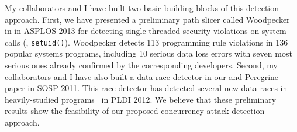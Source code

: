 



 


 My collaborators and I have built two basic 
building blocks of this detection approach. First, we have presented a 
preliminary path slicer called Woodpecker~\cite{woodpecker:asplos13} in 
in ASPLOS 2013 for detecting single-threaded security violations on system 
calls (\eg, \texttt{setuid()}). Woodpecker detects 113 programming rule 
violations in 136 popular systems programs, including 10 serious data loss 
errors with seven most serious ones already confirmed by the corresponding 
developers. Second, my collaborators and I have also built a data race detector 
in our and Peregrine~\cite{peregrine:sosp11} paper in SOSP 2011. This race 
detector has detected several new data races in heavily-studied 
programs~\cite{wu:pldi12} in PLDI 2012. We believe that these preliminary 
results show the feasibility of our proposed concurrency attack detection 
approach.




